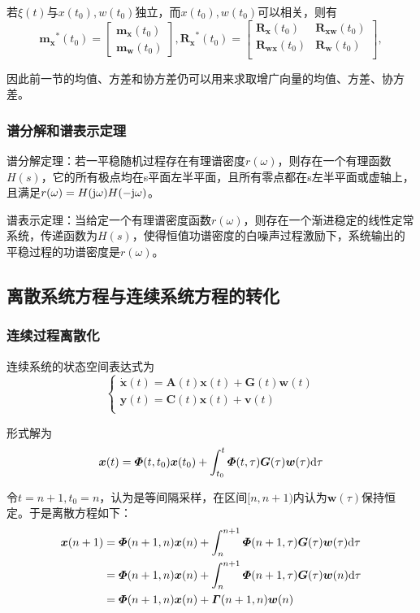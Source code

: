 \documentclass[11pt,a4paper]{ctexart}
\renewcommand{\d}{{\rm d}}
\renewcommand{\j}{{\rm j}}
\begin{document}
            若$\xi(t)$与$x(t_0),w(t_0)$独立，而$x(t_0),w(t_0)$可以相关，则有
            \[
            \bm{m_x}^*(t_0)=\begin{bmatrix}\bm{m_x}(t_0) \\ \bm{m_w}(t_0)\end{bmatrix},
            \bm{R_x}^*(t_0)=\begin{bmatrix}
                \bm{R_x}(t_0) & \bm{R_{xw}}(t_0)\\
                \bm{R_{wx}}(t_0) & \bm{R_w}(t_0)\\
            \end{bmatrix},
            \]

            因此前一节的均值、方差和协方差仍可以用来求取增广向量的均值、方差、协方差。
        \subsubsection{谱分解和谱表示定理}
        谱分解定理：若一平稳随机过程存在有理谱密度$r(\omega)$，则存在一个有理函数$H(s)$，它的所有极点均在s平面左半平面，且所有零点都在s左半平面或虚轴上，且满足$r(\omega)=H(\j\omega)H(-\j\omega)$。

        谱表示定理：当给定一个有理谱密度函数$r(\omega)$，则存在一个渐进稳定的线性定常系统，传递函数为$H(s)$，使得恒值功谱密度的白噪声过程激励下，系统输出的平稳过程的功谱密度是$r(\omega)$。
    \subsection{离散系统方程与连续系统方程的转化}
        \subsubsection{连续过程离散化}
            连续系统的状态空间表达式为
            \[
            \begin{cases}
            \bm{\dot x}(t)=\bm{A}(t)\bm{x}(t)+\bm{G}(t)\bm{w}(t)\\
            \bm{y}(t)=\bm{C}(t)\bm{x}(t)+\bm{v}(t)\\
            \end{cases}
            \]

            形式解为
            \[
            \bm x(t)=\bm\varPhi(t,t_0)\bm x(t_0)+\int_{t_0}^t\bm\varPhi(t,\tau)\bm G(\tau)\bm w(\tau)\d\tau
            \]
            
            令$t=n+1,t_0=n$，认为是等间隔采样，在区间$[n,n+1)$内认为$\bm w(\tau)$保持恒定。于是离散方程如下：
            \begin{align*}
            \bm x(n+1)&=\bm\varPhi(n+1,n)\bm x(n)+\int_{n}^{n+1}\bm\varPhi(n+1,\tau)\bm G(\tau)\bm w(\tau)\d\tau\\
            &=\bm\varPhi(n+1,n)\bm x(n)+\int_{n}^{n+1}\bm\varPhi(n+1,\tau)\bm G(\tau)\bm w(n)\d\tau\\
            &=\bm\varPhi(n+1,n)\bm x(n)+\bm\varGamma(n+1,n)\bm w(n)
            \end{align*}
\end{document}
